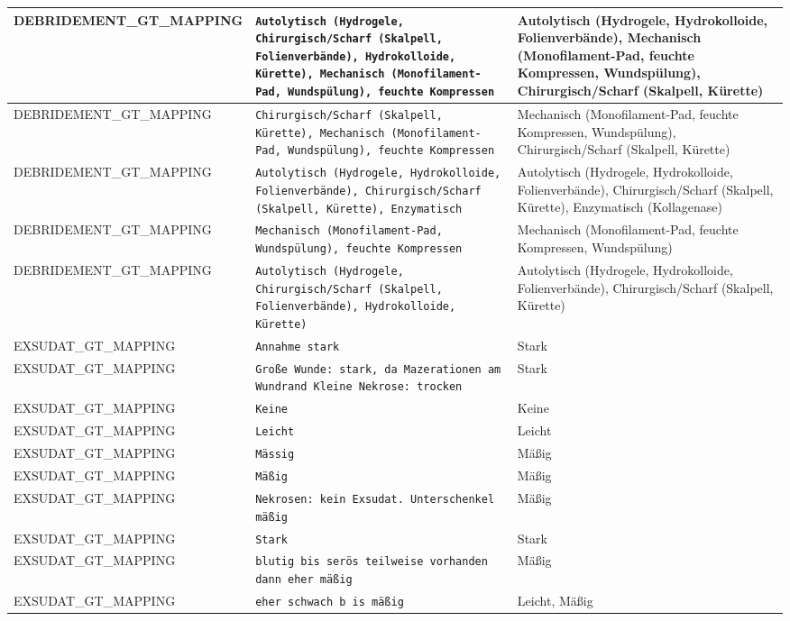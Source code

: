 \begin{longtable}{|p{3.5cm}|p{5cm}|p{6.5cm}|}
DEBRIDEMENT\_GT\_MAPPING & \texttt{Autolytisch (Hydrogele, Chirurgisch/Scharf (Skalpell, Folienverbände), Hydrokolloide, Kürette), Mechanisch (Monofilament-Pad, Wundspülung), feuchte Kompressen} & Autolytisch (Hydrogele, Hydrokolloide, Folienverbände), Mechanisch (Monofilament-Pad, feuchte Kompressen, Wundspülung), Chirurgisch/Scharf (Skalpell, Kürette) \\ \hline
DEBRIDEMENT\_GT\_MAPPING & \texttt{Chirurgisch/Scharf (Skalpell, Kürette), Mechanisch (Monofilament-Pad, Wundspülung), feuchte Kompressen} & Mechanisch (Monofilament-Pad, feuchte Kompressen, Wundspülung), Chirurgisch/Scharf (Skalpell, Kürette) \\ \hline
DEBRIDEMENT\_GT\_MAPPING & \texttt{Autolytisch (Hydrogele, Hydrokolloide, Folienverbände), Chirurgisch/Scharf (Skalpell, Kürette), Enzymatisch} & Autolytisch (Hydrogele, Hydrokolloide, Folienverbände), Chirurgisch/Scharf (Skalpell, Kürette), Enzymatisch (Kollagenase) \\ \hline
DEBRIDEMENT\_GT\_MAPPING & \texttt{Mechanisch (Monofilament-Pad, Wundspülung), feuchte Kompressen} & Mechanisch (Monofilament-Pad, feuchte Kompressen, Wundspülung) \\ \hline
DEBRIDEMENT\_GT\_MAPPING & \texttt{Autolytisch (Hydrogele, Chirurgisch/Scharf (Skalpell, Folienverbände), Hydrokolloide, Kürette)} & Autolytisch (Hydrogele, Hydrokolloide, Folienverbände), Chirurgisch/Scharf (Skalpell, Kürette) \\ \hline
EXSUDAT\_GT\_MAPPING & \texttt{Annahme stark} & Stark \\ \hline
EXSUDAT\_GT\_MAPPING & \texttt{Große Wunde: stark, da Mazerationen am Wundrand
Kleine Nekrose: trocken} & Stark \\ \hline
EXSUDAT\_GT\_MAPPING & \texttt{Keine} & Keine \\ \hline
EXSUDAT\_GT\_MAPPING & \texttt{Leicht} & Leicht \\ \hline
EXSUDAT\_GT\_MAPPING & \texttt{Mässig} & Mäßig \\ \hline
EXSUDAT\_GT\_MAPPING & \texttt{Mäßig} & Mäßig \\ \hline
EXSUDAT\_GT\_MAPPING & \texttt{Nekrosen: kein Exsudat. Unterschenkel mäßig} & Mäßig \\ \hline
EXSUDAT\_GT\_MAPPING & \texttt{Stark} & Stark \\ \hline
EXSUDAT\_GT\_MAPPING & \texttt{blutig bis serös teilweise vorhanden dann eher mäßig} & Mäßig \\ \hline
EXSUDAT\_GT\_MAPPING & \texttt{eher schwach b is mäßig} & Leicht, Mäßig \\ \hline

\end{longtable}
